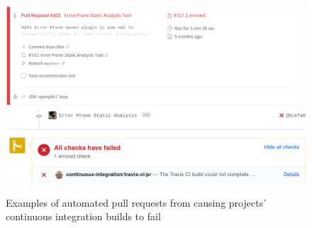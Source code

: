 
\begin{figure}
\centering
	\includegraphics[width=\textwidth]{images/error.png}
	\includegraphics[width=\textwidth]{images/error2.png}
	\caption{Examples of automated pull requests from \tool causing projects' continuous integration builds to fail}	
	\label{fig:error} 
\end{figure}





